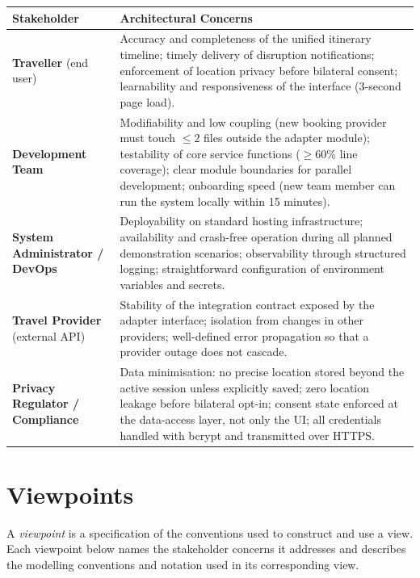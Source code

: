 \documentclass[12pt,a4paper]{article}
\begin{document}
\vspace{0.5em}
\begin{tabularx}{\textwidth}{L{3.8cm}X}
\toprule
\textbf{Stakeholder} & \textbf{Architectural Concerns} \\
\midrule
\textbf{Traveller} (end user) &
  Accuracy and completeness of the unified itinerary timeline; timely delivery of disruption
  notifications; enforcement of location privacy before bilateral consent; learnability and
  responsiveness of the interface (3-second page load). \\
\addlinespace
\textbf{Development Team} &
  Modifiability and low coupling (new booking provider must touch $\leq$2 files outside the
  adapter module); testability of core service functions ($\geq$60\% line coverage); clear module
  boundaries for parallel development; onboarding speed (new team member can run the system
  locally within 15 minutes). \\
\addlinespace
\textbf{System Administrator / DevOps} &
  Deployability on standard hosting infrastructure; availability and crash-free operation during
  all planned demonstration scenarios; observability through structured logging; straightforward
  configuration of environment variables and secrets. \\
\addlinespace
\textbf{Travel Provider} (external API) &
  Stability of the integration contract exposed by the adapter interface; isolation from changes
  in other providers; well-defined error propagation so that a provider outage does not cascade. \\
\addlinespace
\textbf{Privacy Regulator / Compliance} &
  Data minimisation: no precise location stored beyond the active session unless explicitly saved;
  zero location leakage before bilateral opt-in; consent state enforced at the data-access layer,
  not only the UI; all credentials handled with bcrypt and transmitted over HTTPS. \\
\bottomrule
\end{tabularx}

\section{Viewpoints}

A \textit{viewpoint} is a specification of the conventions used to construct and use a view. Each
viewpoint below names the stakeholder concerns it addresses and describes the modelling conventions
and notation used in its corresponding view.
\end{document}

